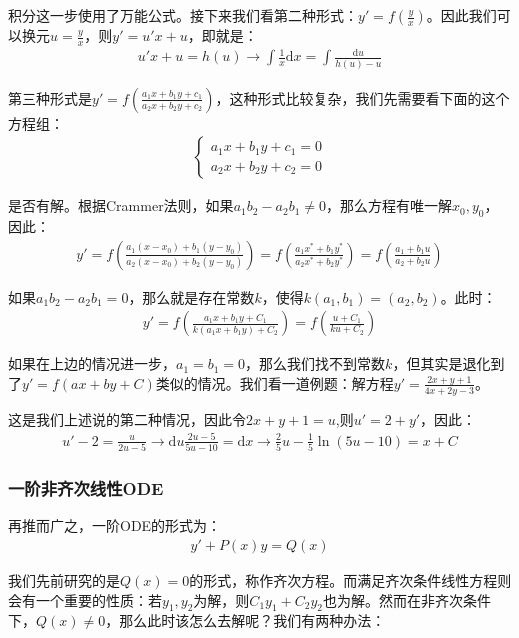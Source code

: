 \documentclass{ctexart}
\begin{document}
积分这一步使用了万能公式。接下来我们看第二种形式：$y'=f(\frac{y}{x})$。因此我们可以换元$u=\frac{y}{x}$，则$y'=u'x+u$，即就是：
\begin{align*}
u'x+u=h(u)\to \int\frac{1}{x}\mathrm{d}x=\int\frac{\mathrm{d}u }{h(u)-u} \tag{4-6} 
\end{align*}

第三种形式是$y'=f(\frac{a_1x+b_1y+c_1}{a_2x+b_2y+c_2})$，这种形式比较复杂，我们先需要看下面的这个方程组：
\begin{align*}
\begin{cases}
a_1x+b_1y+c_1=0\\
a_2x+b_2y+c_2=0
\end{cases}      
\end{align*}

是否有解。根据Crammer法则，如果$a_1b_2-a_2b_1\neq0$，那么方程有唯一解$x_0,y_0$，因此：
\begin{align*}
y'=f\left(\frac{a_1(x-x_0)+b_1(y-y_0)}{a_2(x-x_0)+b_2(y-y_0)} \right)    
=f\left(\frac{a_1x^*+b_1y^*}{a_2x^*+b_2y^*} \right)
=f\left(\frac{a_1+b_1u}{a_2+b_2u} \right)\tag{4-7}
\end{align*}

如果$a_1b_2-a_2b_1=0$，那么就是存在常数$k$，使得$k(a_1,b_1)=(a_2,b_2)$。此时：
\begin{align*}
y'=f\left(\frac{a_1x+b_1y+C_1}{k(a_1x+b_1y)+C_2} \right)    
=f\left(\frac{u+C_1}{ku+C_2} \right)\tag{4-8}
\end{align*}

如果在上边的情况进一步，$a_1=b_1=0$，那么我们找不到常数$k$，但其实是退化到了$y'=f(ax+by+C)$类似的情况。我们看一道例题：解方程$y'=\frac{2x+y+1}{4x+2y-3}$。

这是我们上述说的第二种情况，因此令$2x+y+1=u$,则$u'=2+y'$，因此：
\begin{align*}
u'-2=\frac{u}{2u-5} \to \mathrm{d}u\frac{2u-5}{5u-10}=\mathrm{d}x \to\frac{2}{5}u-
\frac{1}{5}\ln (5u-10)=x+C   
\end{align*}

\subsubsection{一阶非齐次线性ODE}
再推而广之，一阶ODE的形式为：
\begin{align*}
    y'+P(x)y=Q(x)
\end{align*}

我们先前研究的是$Q(x)=0$的形式，称作齐次方程。而满足齐次条件线性方程则会有一个重要的性质：若$y_1,y_2$为解，则$C_1y_1+C_2y_2$也为解。然而在非齐次条件下，$Q(x)\neq 0$，那么此时该怎么去解呢？我们有两种办法：
\end{document}
